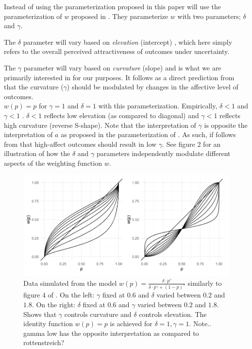 \documentclass[12pt]{article}
\begin{document}
Instead of using the parameterization
proposed in \textcite{rottenstreich2001money}
this paper will use the parameterization
of $w$ proposed in \textcite{gonzalez1999shape}.
They parameterize $w$ with two parameters;
$\delta$ and $\gamma$.

\vspace{3mm}

The $\delta$ parameter will vary based on
\emph{elevation} (intercept)
\autocite{gonzalez1999shape},
which here simply refers to the overall
perceived attractiveness of outcomes
under uncertainty.

\vspace{3mm}

The $\gamma$ parameter will vary based on
\emph{curvature} (slope)
\autocite{gonzalez1999shape} and is what we
are primarily interested in for our purposes.
It follows as a direct prediction from
\textcite{rottenstreich2001money} that the
curvature ($\gamma$) should be modulated by changes in
the affective level of outcomes. \\

$w(p) = p$ for  $\gamma = 1$ and $\delta = 1$
with this parameterization. Empirically,
$\delta < 1$ and $\gamma < 1$
\autocite{gonzalez1999shape}. $\delta < 1$
reflects low elevation (as compared to diagonal)
and  $\gamma < 1$ reflects high curvature
(reverse S-shape). Note that the interpretation
of $\gamma$ is opposite the interpretation of
$a$ as proposed in the parameterization of
\textcite{rottenstreich2001money}. As such,
if follows from \textcite{rottenstreich2001money}
that high-affect outcomes should result in low
$\gamma$.
See figure 2 for an
illustration of how the $\delta$
and $\gamma$ parameters independently modulate
different aspects of the weighting function $w$.

\begin{figure}[H]
	\includegraphics[width = \linewidth]{../Figures/Fig2.png}
	\caption{Data simulated from the model
		$w(p) = \frac{\delta \cdot p^{\gamma}}
	{\delta \cdot p^{\gamma} +
	(1-p)^{\gamma}}$ similarly to figure 4
	of \textcite{gonzalez1999shape}.
	On the left: $\gamma$ fixed at $0.6$
	and $\delta$ varied between $0.2$ and $1.8$.
	On the right: $\delta$ fixed at $0.6$
	and $\gamma$ varied between $0.2$ and $1.8$.
	Shows that $\gamma$  controls
	curvature and $\delta$ controls
	elevation. The identity function $w(p) = p$
	is achieved for $\delta = 1, \gamma = 1$.
	Note.. gamma low has the opposite interpretation
	as compared to rottenstreich?}
\end{figure}
\end{document}
